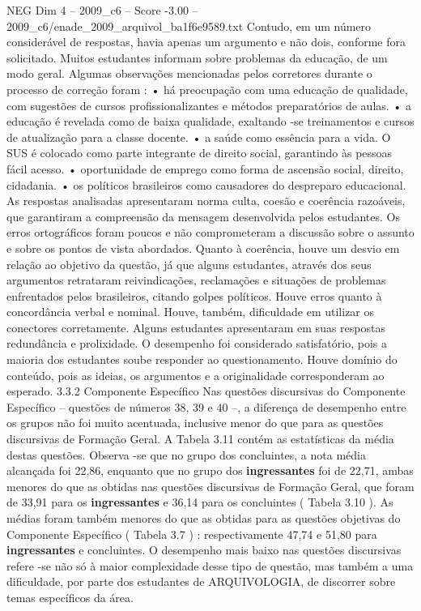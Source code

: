 \begin{textsample}{NEG Dim 4 – 2009\_c6 – Score -3.00 – 2009\_c6/enade\_2009\_arquivol\_ba1f6e9589.txt}
Contudo, em um número considerável de respostas, havia apenas um argumento e não dois, conforme fora solicitado.
Muitos estudantes informam sobre problemas da educação, de um modo geral.
Algumas observações mencionadas pelos corretores durante o processo de correção foram : • há preocupação com uma educação de qualidade, com sugestões de cursos profissionalizantes e métodos preparatórios de aulas. • a educação é revelada como de baixa qualidade, exaltando -se treinamentos e cursos de atualização para a classe docente. • a saúde como essência para a vida.
O SUS é colocado como parte integrante de direito social, garantindo às pessoas fácil acesso. • oportunidade de emprego como forma de ascensão social, direito, cidadania. • os políticos brasileiros como causadores do despreparo educacional.
As respostas analisadas apresentaram norma culta, coesão e coerência razoáveis, que garantiram a compreensão da mensagem desenvolvida pelos estudantes.
Os erros ortográficos foram poucos e não comprometeram a discussão sobre o assunto e sobre os pontos de vista abordados.
Quanto à coerência, houve um desvio em relação ao objetivo da questão, já que alguns estudantes, através dos seus argumentos retrataram reivindicações, reclamações e situações de problemas enfrentados pelos brasileiros, citando golpes políticos.
Houve erros quanto à concordância verbal e nominal.
Houve, também, dificuldade em utilizar os conectores corretamente.
Alguns estudantes apresentaram em suas respostas redundância e prolixidade.
O desempenho foi considerado satisfatório, pois a maioria dos estudantes soube responder ao questionamento.
Houve domínio do conteúdo, pois as ideias, os argumentos e a originalidade corresponderam ao esperado. 3.3.2 Componente Específico Nas questões discursivas do Componente Específico – questões de números 38, 39 e 40 –, a diferença de desempenho entre os grupos não foi muito acentuada, inclusive menor do que para as questões discursivas de Formação Geral.
A Tabela 3.11 contém as estatísticas da média destas questões.
Observa -se que no grupo dos concluintes, a nota média alcançada foi 22,86, enquanto que no grupo dos \textbf{ingressantes} foi de 22,71, ambas menores do que as obtidas nas questões discursivas de Formação Geral, que foram de 33,91 para os \textbf{ingressantes} e 36,14 para os concluintes ( Tabela 3.10 ).
As médias foram também menores do que as obtidas para as questões objetivas do Componente Específico ( Tabela 3.7 ) : respectivamente 47,74 e 51,80 para \textbf{ingressantes} e concluintes.
O desempenho mais baixo nas questões discursivas refere -se não só à maior complexidade desse tipo de questão, mas também a uma dificuldade, por parte dos estudantes de ARQUIVOLOGIA, de discorrer sobre temas específicos da área.

\end{textsample}

